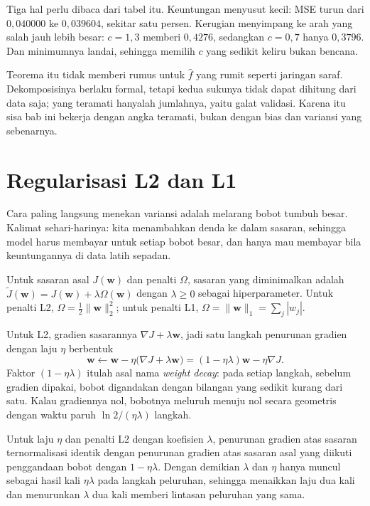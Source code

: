 Tiga hal perlu dibaca dari tabel itu. Keuntungan menyusut kecil: MSE turun dari
$0{,}040000$ ke $0{,}039604$, sekitar satu persen. Kerugian menyimpang ke arah yang
salah jauh lebih besar: $c=1{,}3$ memberi $0{,}4276$, sedangkan $c=0{,}7$ hanya
$0{,}3796$. Dan minimumnya landai, sehingga memilih $c$ yang sedikit keliru bukan
bencana.

Teorema itu tidak memberi rumus untuk $\hat f$ yang rumit seperti jaringan saraf.
Dekomposisinya berlaku formal, tetapi kedua sukunya tidak dapat dihitung dari data saja;
yang teramati hanyalah jumlahnya, yaitu galat validasi. Karena itu sisa bab ini bekerja
dengan angka teramati, bukan dengan bias dan variansi yang sebenarnya.

\section{Regularisasi L2 dan L1}

Cara paling langsung menekan variansi adalah melarang bobot tumbuh besar. Kalimat
sehari-harinya: kita menambahkan denda ke dalam sasaran, sehingga model harus membayar
untuk setiap bobot besar, dan hanya mau membayar bila keuntungannya di data latih sepadan.


\begin{definisi}
Untuk sasaran asal $J(\mathbf{w})$ dan penalti $\Omega$, sasaran yang diminimalkan
adalah $\tilde J(\mathbf{w})=J(\mathbf{w})+\lambda\Omega(\mathbf{w})$ dengan
$\lambda\ge0$ sebagai hiperparameter. Untuk penalti L2, $\Omega=\frac12\|\mathbf{w}\|_2^2$;
untuk penalti L1, $\Omega=\|\mathbf{w}\|_1=\sum_j|w_j|$.
\end{definisi}

Untuk L2, gradien sasarannya $\nabla J+\lambda\mathbf{w}$, jadi satu langkah penurunan
gradien dengan laju $\eta$ berbentuk
\[
\mathbf{w}\leftarrow\mathbf{w}-\eta\bigl(\nabla J+\lambda\mathbf{w}\bigr)
=(1-\eta\lambda)\mathbf{w}-\eta\nabla J .
\]
Faktor $(1-\eta\lambda)$ itulah asal nama \emph{weight decay}: pada setiap langkah,
sebelum gradien dipakai, bobot digandakan dengan bilangan yang sedikit kurang dari satu.
Kalau gradiennya nol, bobotnya meluruh menuju nol secara geometris dengan waktu paruh
$\ln 2/(\eta\lambda)$ langkah.

\begin{akibat}
Untuk laju $\eta$ dan penalti L2 dengan koefisien $\lambda$, penurunan gradien atas
sasaran ternormalisasi identik dengan penurunan gradien atas sasaran asal yang diikuti
penggandaan bobot dengan $1-\eta\lambda$. Dengan demikian $\lambda$ dan $\eta$ hanya
muncul sebagai hasil kali $\eta\lambda$ pada langkah peluruhan, sehingga menaikkan laju
dua kali dan menurunkan $\lambda$ dua kali memberi lintasan peluruhan yang sama.
\end{akibat}

